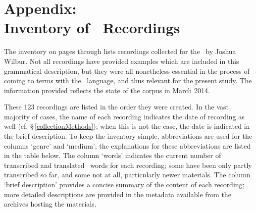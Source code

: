 %



\appendix%
\chapter*{Appendix: \\Inventory of \PS\ Recordings}
\label{inventory}\hypertarget{inventoryRef}{}
The inventory on pages \pageref{inventoryBegin} through \pageref{inventoryEnd} 
lists recordings collected for the \PSDP\ by Joshua Wilbur. Not all recordings have provided examples which are included in this grammatical description, but they were all nonetheless essential in the process of coming to terms with the \PS\ language, and thus relevant for the present study. 
The information provided reflects the state of the corpus in March 2014. 

These 123 recordings are listed in the order they were created. In the vast majority of cases, the name of each recording indicates the date of recording as well (cf. §\,\ref{collectionMethods}); when this is not the case, the date is indicated in the brief description. To keep the inventory simple, %
abbreviations are used for the columns ‘genre’ and ‘medium’; %
the explanations for these abbreviations are listed in the table below. %
The column ‘words’ indicates the current number of transcribed and translated \PS\ words for each recording; some have been only partly transcribed so far, and some not at all, particularly newer materials. 
The column ‘brief description’ provides a concise summary of the content of each recording; more detailed descriptions are provided in the metadata available from the archives hosting the materials. 

